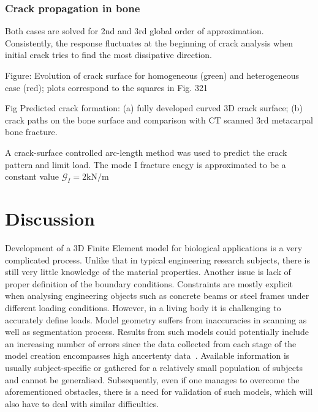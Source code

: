 \documentclass[11pt]{acmeArticle}
\numberwithin{equation}{section}
\begin{document}
\subsubsection{Crack propagation in bone}

Both cases are solved for 2nd and 3rd global order of approximation. Consistently, the response fluctuates at the beginning of crack analysis when initial crack tries to find the most dissipative direction.




Figure: Evolution of crack surface for homogeneous (green) and heterogeneous case (red); plots
correspond to the squares in Fig. 321


Fig Predicted crack formation: (a) fully developed curved 3D crack surface; (b) crack paths on the bone surface and comparison with CT scanned 3rd metacarpal bone fracture.


A crack-surface controlled arc-length method was used to predict the crack pattern and limit load. 
The mode I fracture enegy is approximated to be a constant value $\mathcal{G}_{I}=2 \mathrm{kN} / \mathrm{m}$

\section{Discussion}\label{sec:discussion}
Development of a 3D Finite Element model for biological applications is a very complicated process. 
Unlike that in typical engineering research subjects, there is still very little knowledge of the material properties. 
Another issue is lack of proper definition of the boundary conditions. Constraints are mostly explicit when analysing engineering objects such as concrete beams or steel frames under different loading conditions. 
However, in a living body it is challenging to accurately define loads. 
Model geometry suffers from inaccuracies in scanning as well as segmentation process. 
Results from such models could potentially include an increasing number of errors since the data collected from each stage of the 
model creation encompasses high ancertenty data~\citep{campoli2014effects}.
Available information is usually subject-specific or gathered for a relatively small population of subjects and cannot be generalised. 
Subsequently, even if one manages to overcome the aforementioned obstacles, there is a need for validation of such models, which will also have to deal with similar difficulties. 
\end{document}
